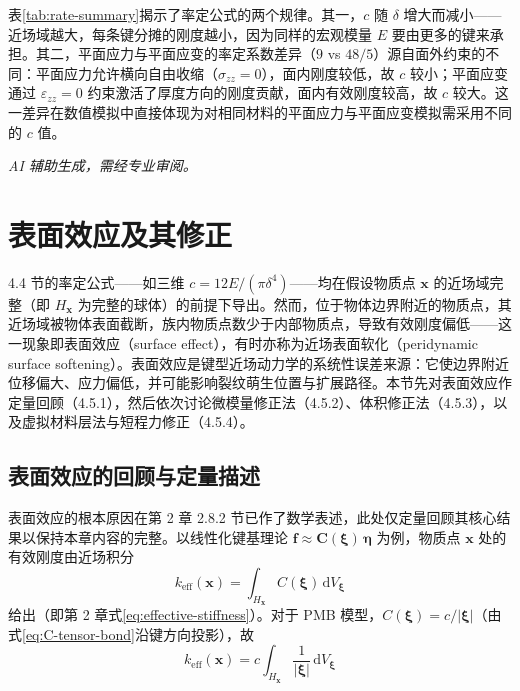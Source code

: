 表\ref{tab:rate-summary}揭示了率定公式的两个规律。其一，$c$ 随 $\delta$ 增大而减小——近场域越大，每条键分摊的刚度越小，因为同样的宏观模量 $E$ 要由更多的键来承担。其二，平面应力与平面应变的率定系数差异（$9$ vs $48/5$）源自面外约束的不同：平面应力允许横向自由收缩（$\sigma_{zz}=0$），面内刚度较低，故 $c$ 较小；平面应变通过 $\varepsilon_{zz}=0$ 约束激活了厚度方向的刚度贡献，面内有效刚度较高，故 $c$ 较大。这一差异在数值模拟中直接体现为对相同材料的平面应力与平面应变模拟需采用不同的 $c$ 值。

\emph{AI 辅助生成，需经专业审阅。}

\section{表面效应及其修正}

4.4 节的率定公式——如三维 $c=12E/(\pi\delta^{4})$——均在假设物质点 $\mathbf{x}$ 的近场域完整（即 $H_{\mathbf{x}}$ 为完整的球体）的前提下导出。然而，位于物体边界附近的物质点，其近场域被物体表面截断，族内物质点数少于内部物质点，导致有效刚度偏低——这一现象即表面效应（surface effect），有时亦称为近场表面软化（peridynamic surface softening）。表面效应是键型近场动力学的系统性误差来源：它使边界附近位移偏大、应力偏低，并可能影响裂纹萌生位置与扩展路径。本节先对表面效应作定量回顾（4.5.1），然后依次讨论微模量修正法（4.5.2）、体积修正法（4.5.3），以及虚拟材料层法与短程力修正（4.5.4）。

\subsection{表面效应的回顾与定量描述}

表面效应的根本原因在第 2 章 2.8.2 节已作了数学表述，此处仅定量回顾其核心结果以保持本章内容的完整。以线性化键基理论 $\mathbf{f}\approx\mathbf{C}(\boldsymbol{\xi})\,\boldsymbol{\eta}$ 为例，物质点 $\mathbf{x}$ 处的有效刚度由近场积分
\begin{equation}
k_{\mathrm{eff}}(\mathbf{x}) = \int_{H_{\mathbf{x}}} C(\boldsymbol{\xi})\,\mathrm{d}V_{\boldsymbol{\xi}}
\label{eq:effective-stiffness-recall}
\end{equation}
给出（即第 2 章式\eqref{eq:effective-stiffness}）。对于 PMB 模型，$C(\boldsymbol{\xi})=c/|\boldsymbol{\xi}|$（由式\eqref{eq:C-tensor-bond}沿键方向投影），故
\begin{equation}
k_{\mathrm{eff}}(\mathbf{x}) = c\int_{H_{\mathbf{x}}} \frac{1}{|\boldsymbol{\xi}|}\,\mathrm{d}V_{\boldsymbol{\xi}}
\label{eq:keff-pmb}
\end{equation}

